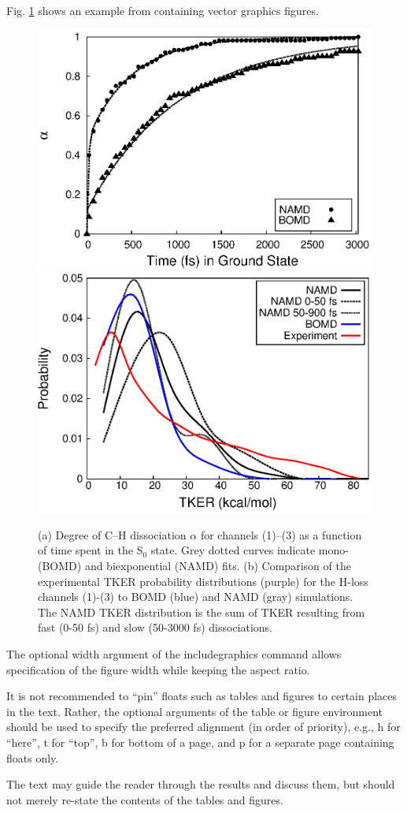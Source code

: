 \documentclass[11pt]{article}
\begin{document}
Fig. \ref{fig:hloss} shows an example from
\cite{Vincent16JPhysChemLett7p4185} containing vector graphics figures.
\begin{figure}[htbp]
  \centering
  \label{fig:hloss}

  \includegraphics[width=.49\textwidth]{decay.eps}
  \includegraphics[width=.49\textwidth]{namdbomdall.eps}

  \caption{(a) Degree of C--H dissociation $\alpha$ for
    channels (1)--(3) as a function of time spent in the S$_0$ 
    state. Grey dotted curves indicate mono- (BOMD) and biexponential
    (NAMD) fits. (b) Comparison of the experimental TKER probability
    distributions \cite{Lee09JChemPhys131p174312} (purple) for the
    H-loss channels (1)-(3) to BOMD (blue) and NAMD (gray)
    simulations. The NAMD TKER distribution is the sum of TKER
    resulting from fast (0-50 fs) and slow (50-3000 fs) dissociations.}  
\end{figure}
The optional width argument of the includegraphics command allows
specification of the figure width while keeping the aspect ratio. 

It is not recommended to ``pin'' floats such as tables and figures to
certain places in the text. Rather, the optional arguments of the table
or figure environment should be used to specify the preferred alignment
(in order of priority), e.g., h for ``here'', t for ``top'', b for
bottom of a page, and p for a separate page containing floats only.

The text may guide the reader through the results and discuss them, but
should not merely re-state the contents of the tables and figures.
\end{document}
